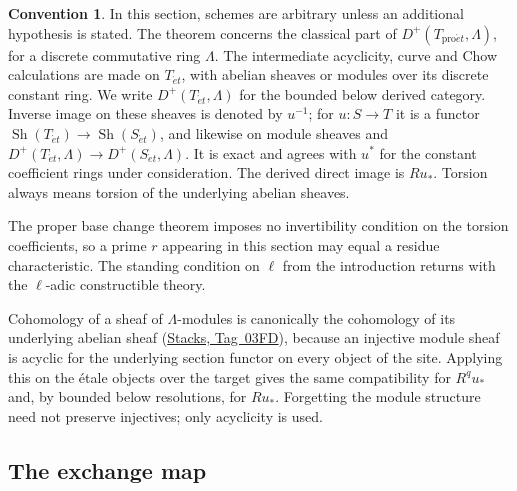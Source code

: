 \documentclass[11pt,a4paper]{article}
\numberwithin{equation}{section}
\theoremstyle{definition}
\newtheorem{convention}[theorem]{Convention}
\theoremstyle{remark}
\newcommand{\D}{D}
\newcommand{\Sh}{\operatorname{Sh}}
\newcommand{\et}{\acute{e}t}
\newcommand{\proet}{\mathrm{pro}\acute{e}t}
\newcommand{\stacks}[1]{\href{https://stacks.math.columbia.edu/tag/#1}{\textnormal{Stacks, Tag~#1}}}
\begin{document}
\begin{convention}\label{pbc:conventions}
In this section, schemes are arbitrary unless an additional hypothesis
is stated. The theorem concerns the classical part of
$D^+(T_{\proet},\Lambda)$, for a discrete commutative ring $\Lambda$.
The intermediate acyclicity, curve and Chow calculations are made on
$T_{\et}$, with abelian sheaves or modules over its discrete constant
ring. We write $\D^+(T_{\et},\Lambda)$ for the bounded below derived
category. Inverse image on these sheaves is denoted by $u^{-1}$; for
$u:S\to T$ it is a functor $\Sh(T_{\et})\to\Sh(S_{\et})$, and likewise
on module sheaves and $\D^+(T_{\et},\Lambda)\to\D^+(S_{\et},\Lambda)$. It is
exact and agrees with $u^*$ for the constant coefficient rings under
consideration. The derived direct image is $Ru_*$. Torsion always
means torsion of the underlying abelian sheaves.

The proper base change theorem imposes no invertibility condition on
the torsion coefficients, so a prime $r$ appearing in this section may
equal a residue characteristic. The standing condition on $\ell$ from
the introduction returns with the $\ell$-adic constructible theory.
\end{convention}

Cohomology of a sheaf of $\Lambda$-modules is canonically the
cohomology of its underlying abelian sheaf (\stacks{03FD}), because an
injective module sheaf is acyclic for the underlying section functor on
every object of the site. Applying this on the \'etale objects over the
target gives the same compatibility for $R^qu_*$ and, by bounded below
resolutions, for $Ru_*$. Forgetting the module structure need not
preserve injectives; only acyclicity is used.

\subsection{The exchange map}
\end{document}
